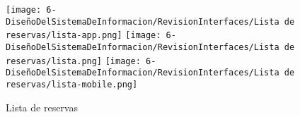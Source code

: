 \begin{figure}[H]
	\centering
	\texttt{[image: 6-DiseñoDelSistemaDeInformacion/RevisionInterfaces/Lista de reservas/lista-app.png]}
	\texttt{[image: 6-DiseñoDelSistemaDeInformacion/RevisionInterfaces/Lista de reservas/lista.png]}
	\texttt{[image: 6-DiseñoDelSistemaDeInformacion/RevisionInterfaces/Lista de reservas/lista-mobile.png]}
	\caption{Lista de reservas}
\end{figure}